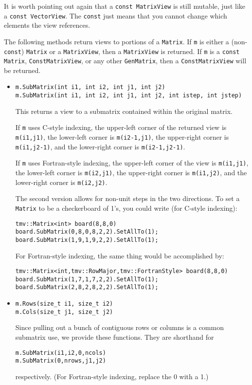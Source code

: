 \documentclass[twoside,letterpaper,11pt]{article}
\renewcommand{\tt}[1]{{\texttt {#1}}}
\begin{document}
It is worth pointing out again that a 
\tt{const MatrixView} is still mutable, just like a \tt{const VectorView}.
The \tt{const} just means that you cannot change which elements
the view references.

The following methods return views to portions of a \tt{Matrix}.
If \tt{m} is either a (non-\tt{const}) \tt{Matrix}
or a \tt{MatrixView}, then a \tt{MatrixView} is returned.
If \tt{m} is a \tt{const Matrix}, \tt{ConstMatrixView}, or any other \tt{GenMatrix},
then a \tt{ConstMatrixView} will be returned. 

\begin{itemize}
\item
\begin{verbatim}
m.SubMatrix(int i1, int i2, int j1, int j2)
m.SubMatrix(int i1, int i2, int j1, int j2, int istep, int jstep)
\end{verbatim}
This returns a view to a submatrix contained within the original matrix.

If \tt{m} uses C-style indexing, 
the upper-left corner of the returned view is \tt{m(i1,j1)},
the lower-left corner is \tt{m(i2-1,j1)},
the upper-right corner is \tt{m(i1,j2-1)}, and
the lower-right corner is \tt{m(i2-1,j2-1)}.

If \tt{m} uses Fortran-style indexing, 
the upper-left corner of the view is \tt{m(i1,j1)},
the lower-left corner is \tt{m(i2,j1)},
the upper-right corner is \tt{m(i1,j2)}, and
the lower-right corner is \tt{m(i2,j2)}.

The second version allows for non-unit steps in the two directions.
To set a \tt{Matrix} to be a checkerboard of 1's, you could write 
(for C-style indexing):
\begin{verbatim}
tmv::Matrix<int> board(8,8,0)
board.SubMatrix(0,8,0,8,2,2).SetAllTo(1);
board.SubMatrix(1,9,1,9,2,2).SetAllTo(1);
\end{verbatim}

For Fortran-style indexing, the same thing would be accomplished by:
\begin{verbatim}
tmv::Matrix<int,tmv::RowMajor,tmv::FortranStyle> board(8,8,0)
board.SubMatrix(1,7,1,7,2,2).SetAllTo(1);
board.SubMatrix(2,8,2,8,2,2).SetAllTo(1);
\end{verbatim}

\item
\begin{verbatim}
m.Rows(size_t i1, size_t i2)
m.Cols(size_t j1, size_t j2)
\end{verbatim}
Since pulling out a bunch of contiguous rows or columns is a common 
submatrix use, we provide these functions.  They are shorthand for
\begin{verbatim}
m.SubMatrix(i1,i2,0,ncols)
m.SubMatrix(0,nrows,j1,j2)
\end{verbatim}
respectively.  (For Fortran-style indexing, replace the 0 with a 1.)


\end{itemize}
\end{document}
